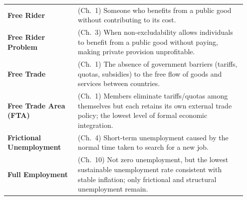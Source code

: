 \documentclass[11pt, a4paper, twoside]{book}
\begin{document}
\begin{longtable}{@{}>{\RaggedRight\arraybackslash}p{0.28\linewidth}>{\RaggedRight\arraybackslash}p{0.67\linewidth}@{}}
\textbf{Free Rider} & (Ch.~1) Someone who benefits from a public good without contributing to its cost. \\
\textbf{Free Rider Problem} & (Ch.~3) When non-excludability allows individuals to benefit from a public good without paying, making private provision unprofitable. \\
\textbf{Free Trade} & (Ch.~1) The absence of government barriers (tariffs, quotas, subsidies) to the free flow of goods and services between countries. \\
\textbf{Free Trade Area (FTA)} & (Ch.~1) Members eliminate tariffs/quotas among themselves but each retains its own external trade policy; the lowest level of formal economic integration. \\
\textbf{Frictional Unemployment} & (Ch.~4) Short-term unemployment caused by the normal time taken to search for a new job. \\
\textbf{Full Employment} & (Ch.~10) Not zero unemployment, but the lowest sustainable unemployment rate consistent with stable inflation; only frictional and structural unemployment remain. \\


\end{longtable}
\end{document}
